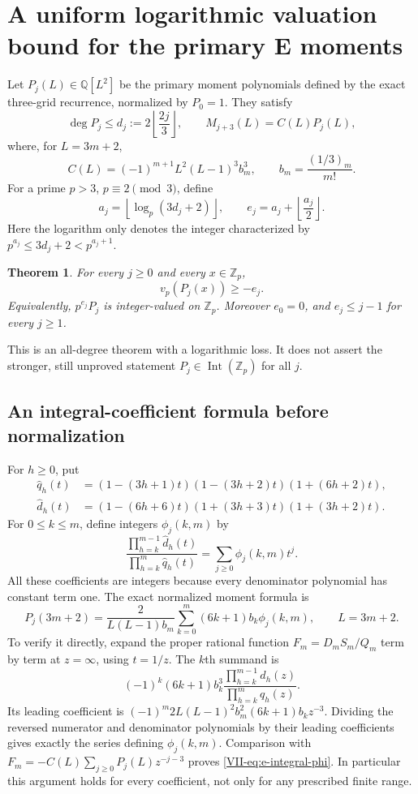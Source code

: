 \documentclass[11pt,letterpaper]{article}
\newtheorem{theorem}{Theorem}[section]
\numberwithin{equation}{section}
\begin{document}
\section{A uniform logarithmic valuation bound for the primary E moments}\label{loc-VII-5}
\label{VII-sec:e-uniform-log-bound}
Let $P_j(L)\in\mathbb Q[L^2]$ be the primary moment polynomials defined
by the exact three-grid recurrence, normalized by $P_0=1$. They satisfy
\[
 \deg P_j\le d_j:=2\left\lfloor\frac{2j}{3}\right\rfloor,
 \qquad M_{j+3}(L)=C(L)P_j(L),
\]
where, for $L=3m+2$,
\[
 C(L)=(-1)^{m+1}L^2(L-1)^3b_m^3,\qquad b_m=\frac{(1/3)_m}{m!}.
\]
For a prime $p>3$, $p\equiv2\pmod3$, define
\[
 a_j=\left\lfloor\log_p(3d_j+2)\right\rfloor,
 \qquad e_j=a_j+\left\lfloor\frac{a_j}{2}\right\rfloor.
\]
Here the logarithm only denotes the integer characterized by
$p^{a_j}\le3d_j+2<p^{a_j+1}$.

\begin{theorem}\label{VII-thm:e-log-bound}
For every $j\ge0$ and every $x\in\mathbb Z_p$,
\[
 \boxed{v_p(P_j(x))\ge-e_j.}
\]
Equivalently, $p^{e_j}P_j$ is integer-valued on $\mathbb Z_p$.
Moreover $e_0=0$, and $e_j\le j-1$ for every $j\ge1$.
\end{theorem}
This is an all-degree theorem with a logarithmic loss. It does not
assert the stronger, still unproved statement
$P_j\in\operatorname{Int}(\mathbb Z_p)$ for all $j$.

\subsection{An integral-coefficient formula before normalization}
For $h\ge0$, put
\begin{align*}
 \widehat q_h(t)&=(1-(3h+1)t)(1-(3h+2)t)(1+(6h+2)t),\\
 \widehat d_h(t)&=(1-(6h+6)t)(1+(3h+3)t)(1+(3h+2)t).
\end{align*}
For $0\le k\le m$, define integers $\phi_j(k,m)$ by
\[
 \frac{\prod_{h=k}^{m-1}\widehat d_h(t)}
      {\prod_{h=k}^{m}\widehat q_h(t)}
 =\sum_{j\ge0}\phi_j(k,m)t^j.
\]
All these coefficients are integers because every denominator
polynomial has constant term one. The exact normalized moment formula is
\begin{equation}\label{VII-eq:e-integral-phi}
 P_j(3m+2)=\frac{2}{L(L-1)b_m}
          \sum_{k=0}^m(6k+1)b_k\phi_j(k,m),\qquad L=3m+2.
\end{equation}
To verify it directly, expand the proper rational function
$F_m=D_mS_m/Q_m$ term by term at $z=\infty$, using $t=1/z$.
The $k$th summand is
\[
 (-1)^k(6k+1)b_k^3
 \frac{\prod_{h=k}^{m-1}d_h(z)}{\prod_{h=k}^{m}q_h(z)}.
\]
Its leading coefficient is
$(-1)^m2L(L-1)^2b_m^2(6k+1)b_kz^{-3}$.
Dividing the reversed numerator and denominator polynomials by
their leading coefficients gives exactly the series defining
$\phi_j(k,m)$. Comparison with
$F_m=-C(L)\sum_{j\ge0}P_j(L)z^{-j-3}$ proves
\eqref{VII-eq:e-integral-phi}. In particular this argument holds for
every coefficient, not only for any prescribed finite range.
\end{document}
